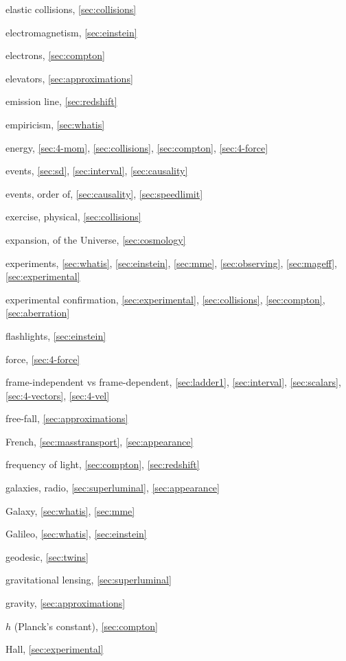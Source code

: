 \begin{theindex}
\item elastic collisions, \ref{sec:collisions}
\item electromagnetism, \ref{sec:einstein}
\item electrons, \ref{sec:compton}
\item elevators, \ref{sec:approximations}
\item emission line, \ref{sec:redshift}
\item empiricism, \ref{sec:whatis}
\item energy, \ref{sec:4-mom}, \ref{sec:collisions}, \ref{sec:compton},
	\ref{sec:4-force}
\item events, \ref{sec:sd}, \ref{sec:interval}, \ref{sec:causality}
\item events, order of, \ref{sec:causality}, \ref{sec:speedlimit}
\item exercise, physical, \ref{sec:collisions}
\item expansion, of the Universe, \ref{sec:cosmology}
\item experiments, \ref{sec:whatis}, \ref{sec:einstein}, \ref{sec:mme},
	\ref{sec:observing}, \ref{sec:mageff}, \ref{sec:experimental}
\item experimental confirmation, \ref{sec:experimental},
	\ref{sec:collisions}, \ref{sec:compton}, \ref{sec:aberration}
\item flashlights, \ref{sec:einstein}
\item force, \ref{sec:4-force}
\item frame-independent vs frame-dependent, \ref{sec:ladder1},
	\ref{sec:interval}, \ref{sec:scalars}, \ref{sec:4-vectors},
	\ref{sec:4-vel}
\item free-fall, \ref{sec:approximations}
\item French, \ref{sec:masstransport}, \ref{sec:appearance}
\item frequency of light, \ref{sec:compton}, \ref{sec:redshift}
\item galaxies, radio, \ref{sec:superluminal}, \ref{sec:appearance}
\item Galaxy, \ref{sec:whatis}, \ref{sec:mme}
\item Galileo, \ref{sec:whatis}, \ref{sec:einstein}
\item geodesic, \ref{sec:twins}
\item gravitational lensing, \ref{sec:superluminal}
\item gravity, \ref{sec:approximations}
\item $h$ (Planck's constant), \ref{sec:compton}
\item Hall, \ref{sec:experimental}

\end{theindex}
